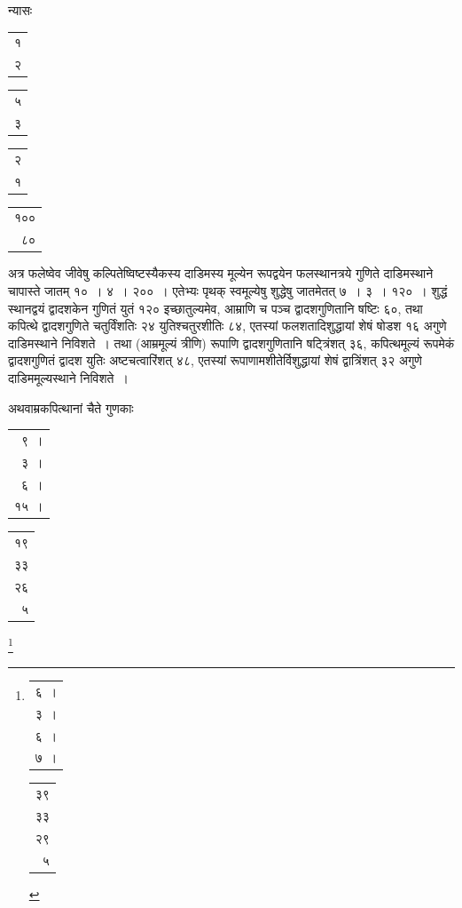 \documentclass[10pt, openany]{book}
\begin{document}
{{{\newpage

न्यासः\textendash \hspace{2mm} \begin{tabular}{r|}१\\ २\end{tabular}\begin{tabular}{r|} ५\\ ३\end{tabular}\begin{tabular}{r|} २\\ १\end{tabular}\begin{tabular}{r} १०० \\८०\end{tabular}
\vspace{3mm}

{अत्र फलेष्वेव जीवेषु कल्पितेष्विष्टस्यैकस्य दाडिमस्य मूल्येन रूपद्वयेन
फलस्थानत्रये}
{गुणिते दाडिमस्थाने चापास्ते जातम् १०~। ४~। २००~। एतेभ्यः पृथक्
स्वमूल्येषु शुद्धेषु}
{जातमेतत् ७~। ३~। १२०~। शुद्धं स्थानद्वयं द्वादशकेन गुणितं युतं १२०
इच्छातुल्यमेव,}
{आम्राणि च पञ्च द्वादशगुणितानि षष्टिः ६०, तथा कपित्थे द्वादशगुणिते
चतुर्विंशतिः}
{२४ युतिश्चतुरशीतिः ८४, एतस्यां फलशतादिशुद्धायां शेषं षोडश १६ अगुणे
दाडिमस्थाने}
{निविशते~। तथा (आम्रमूल्यं त्रीणि) रूपाणि द्वादशगुणितानि षट्त्रिंशत् ३६,
कपित्थमूल्यं}
{रूपमेकं द्वादशगुणितं द्वादश युतिः अष्टचत्वारिंशत् ४८, एतस्यां
रूपाणामशीतेर्विशुद्धायां शेषं}
{द्वात्रिंशत् ३२ अगुणे दाडिममूल्यस्थाने निविशते~।}

\vspace{3mm}
{अथवाम्रकपित्थानां चैते गुणकाः\textemdash}
\vspace{-2mm}

\begin{center}
{\begin{tabular}{|r} ९~।  \\३~।  \\६~।   \\१५~।   \end{tabular} \hspace{-5mm} \begin{tabular}{r|}१९\\ ३३  \\ २६ \\  ५
\end{tabular}}
\end{center}

\vspace{-17mm} 
\hspace{62mm} \renewcommand{\thefootnote}{\s १}\footnote{\s \begin{tabular}{|r} ६~। \\  ३~। \\ ६~। \\ ७~। \end{tabular} \hspace{-5mm} \begin{tabular}{r|}३९  \\  ३३ \\२९ \\ ५\end{tabular}} 
\vspace{13mm} 

}}}
\end{document}
